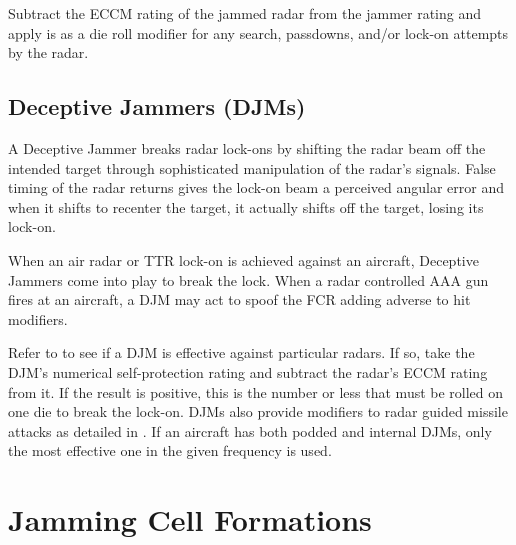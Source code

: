 \begin{advancedrules}
Subtract the ECCM rating of the jammed radar from the  jammer rating and apply is as a die roll modifier for any search, passdowns, and/or lock-on attempts by the radar.


\subsection{Deceptive Jammers (DJMs)}
\label{rule:deceptive-jammers}

A Deceptive Jammer breaks radar lock-ons by shifting the radar beam off the intended target through sophisticated manipulation of the radar's signals. False timing of the radar returns gives the lock-on beam a perceived angular error and when it shifts to recenter the target, it actually shifts off the target, losing its lock-on.

When an air radar or TTR lock-on is achieved against an aircraft, Deceptive Jammers come into play to break the lock. When a radar controlled AAA gun fires at an aircraft, a DJM may act to spoof the FCR adding adverse to hit modifiers.

Refer to  to see if a DJM is effective against particular radars. If so, take the DJM's numerical self-protection rating and subtract the radar's ECCM rating from it.  If the result is positive, this is the number or less that must be rolled on one die to break the lock-on. DJMs also provide modifiers to radar guided missile attacks as detailed in . If an aircraft has both podded and internal DJMs, only the most effective one in the given frequency is used.


\section{Jamming Cell Formations}


\end{advancedrules}
